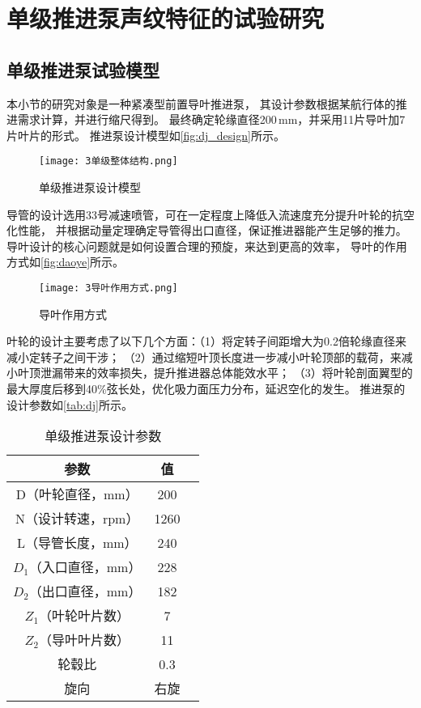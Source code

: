 \section{单级推进泵声纹特征的试验研究}
\subsection{单级推进泵试验模型}
本小节的研究对象是一种紧凑型前置导叶推进泵，
其设计参数根据某航行体的推进需求计算，并进行缩尺得到。
最终确定轮缘直径200\,mm，并采用11片导叶加7片叶片的形式。
推进泵设计模型如\autoref{fig:dj_design}所示。
\begin{figure}[htbp]
    \centering
    \texttt{[image: 3单级整体结构.png]}
    \caption{\label{fig:dj_design}单级推进泵设计模型}
\end{figure}

导管的设计选用33号减速喷管，可在一定程度上降低入流速度充分提升叶轮的抗空化性能，
并根据动量定理确定导管得出口直径，保证推进器能产生足够的推力。
导叶设计的核心问题就是如何设置合理的预旋，来达到更高的效率，
导叶的作用方式如\autoref{fig:daoye}所示。
\begin{figure}[htbp]
    \centering
    \texttt{[image: 3导叶作用方式.png]}
    \caption{\label{fig:daoye}导叶作用方式}
\end{figure}

叶轮的设计主要考虑了以下几个方面：（1）将定转子间距增大为0.2倍轮缘直径来减小定转子之间干涉；
（2）通过缩短叶顶长度进一步减小叶轮顶部的载荷，来减小叶顶泄漏带来的效率损失，提升推进器总体能效水平；
（3）将叶轮剖面翼型的最大厚度后移到40\%弦长处，优化吸力面压力分布，延迟空化的发生。
推进泵的设计参数如\autoref{tab:dj}所示。
\begin{table}[htbp]
    \centering
    \caption{\label{tab:dj}单级推进泵设计参数}
    \begin{tabular}{ccc}
     \toprule
     参数&值\\
     \midrule
     D（叶轮直径，mm）&200\\
     N（设计转速，rpm）&1260\\
     L（导管长度，mm）&240\\
     $D_1$（入口直径，mm）&228\\
     $D_2$（出口直径，mm）&182\\
     $Z_1$（叶轮叶片数）&7\\
     $Z_2$（导叶叶片数）&11\\
     轮毂比&0.3\\
     旋向&右旋\\
     \bottomrule
    \end{tabular}
\end{table}

